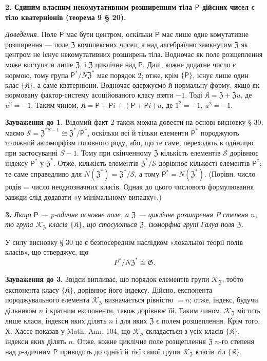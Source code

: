 \documentclass[11pt]{article}
\begin{document}
\noindent\textbf{2. Єдиним власним некомутативним розширенням тіла \(\mathsf{P}\) дійсних чисел є тіло кватерніонів (теорема 9 § 20).}

\noindent\emph{Доведення.} Поле \(\mathsf{P}\) має бути центром, оскільки \(\mathsf{P}\) має лише одне комутативне розширення --- поле \(\mathfrak Z\) комплексних чисел, а над алгебраїчно замкнутим \(\mathfrak Z\) як центром не існує некомутативних розширень тіла. Водночас як поле розщеплення може виступати лише \(\mathfrak Z\), і \(\mathfrak Z\) циклічне над \(\mathsf{P}\). Далі, кожне додатне число є нормою, тому група \(\mathsf{P}^*/N\mathfrak Z^*\) має порядок 2; отже, крім \(\{\mathsf{P}\}\), існує лише один клас \(\{\mathfrak K\}\), а саме кватерніони. Водночас одержуємо й нормальну форму, якщо як нормовану фактор-систему асоційованого класу взяти \(-1\). Тоді \(\mathfrak K=\mathfrak Z+\mathfrak Zu\), де \(u^2=-1\). Таким чином, \(\mathfrak K=\mathsf P+\mathsf Pi+(\mathsf P+\mathsf Pi)u\), де \(1^2=-1\), \(u^2=-1\).

\noindent\textbf{Зауваження до 1.} Відомий факт 2 також можна довести на основі висновку § 30: маємо \(\mathscr S=\mathfrak Z^{*S-1}\cong\mathfrak Z^*/\mathsf{P}^*\), оскільки всі й тільки елементи \(\mathsf{P}^*\) породжують тотожний автоморфізм головного роду, або, що те саме, переходять в одиницю при застосуванні \(S-1\). Тому при скінченному \(\mathfrak Z\) кількість елементів \(\mathscr S\) дорівнює індексу \(\mathsf{P}^*\) у \(\mathfrak Z^*\). Отже, кількість елементів \(\mathfrak Z^*/\mathscr S\) дорівнює кількості елементів \(\mathsf{P}^*\); те саме справедливо для \(N(\mathfrak Z^*)=\mathfrak Z^*/\mathscr S\), а тому \(\mathsf{P}^*=N(\mathfrak Z^*)\). (Порівн. число родів = число неоднозначних класів. Однак до цього числового формулювання завжди слід додавати «у мінімальному випадку».)

\noindent\textbf{3.} \emph{Якщо \(\mathsf{P}\) --- \(p\)-адичне основне поле, а \(\mathfrak Z\) --- циклічне розширення \(P\) степеня \(n\), то група \(\mathscr K_{\mathfrak Z}\) класів \(\{\mathfrak K\}\), що стосуються \(\mathfrak Z\), ізоморфна групі Галуа поля \(\mathfrak Z\).}

У силу висновку § 30 це є безпосереднім наслідком «локальної теорії полів класів», що стверджує, що
\[
P^*/N\mathfrak Z^*\cong\mathfrak G.
\]

\noindent\textbf{Зауваження до 3.} Звідси випливає, що порядок елементів групи \(\mathscr K_{\mathfrak Z}\), тобто експонента класу \(\{\mathfrak K\}\), дорівнює його індексу. Дійсно, експонента породжувального елемента \(\mathscr K_{\mathfrak Z}\) визначається рівністю \(=n\); отже, індекс, будучи дільником \(n\) і кратним експоненти, також дорівнює їй. Таким чином, \(\mathscr K_{\mathfrak Z}\) містить лише класи, індекси яких ділять \(n\) і для яких \(\mathfrak Z\) є полем розщеплення. Крім того, Х. Хассе показав у Math. Ann. 104, що \(\mathscr K_{\mathfrak Z}\) складається з усіх класів \(\{\mathfrak K\}\), індекси яких ділять \(n\). Отже, кожне циклічне поле розщеплення \(\mathfrak Z\) \(n\)-го степеня над \(p\)-адичним \(\mathsf{P}\) приводить до однієї й тієї самої групи \(\mathscr K_{\mathfrak Z}\) класів тіл \(\{\mathfrak K\}\).
\end{document}
